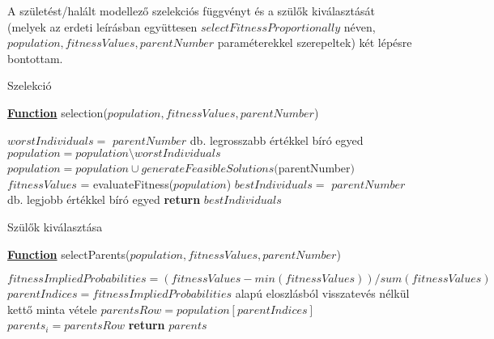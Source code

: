 
A születést/halált modellező szelekciós függvényt és a szülők kiválasztását (melyek az erdeti leírásban együttesen $selectFitnessProportionally$ néven, $population,fitnessValues,parentNumber$ paraméterekkel szerepeltek) két lépésre bontottam.


\begin{algorithm}[H]
\caption{Szelekció}
\label{alg:selection} 
\textbf{\underline{Function}} selection($population,fitnessValues,parentNumber$)
\begin{algorithmic}[1] %
\STATE $worstIndividuals =$ $parentNumber$ db. legrosszabb értékkel bíró egyed 
\STATE $population = population \setminus worstIndividuals$
\STATE $population = population \cup generateFeasibleSolutions($parentNumber$)$
\STATE $fitnessValues$ = evaluateFitness($population$)
\STATE $bestIndividuals =$ $parentNumber$ db. legjobb értékkel bíró egyed 
\STATE \textbf{return} $bestIndividuals$
\end{algorithmic}
\end{algorithm}

\begin{algorithm}[H]
\caption{Szülők kiválasztása}
\label{alg:selectParents} 
\textbf{\underline{Function}} selectParents($population,fitnessValues,parentNumber$)
\begin{algorithmic}[1]
\STATE $fitnessImpliedProbabilities = (fitnessValues - min(fitnessValues)) / sum(fitnessValues)$
	\STATE $parentIndices = fitnessImpliedProbabilities$ alapú eloszlásból visszatevés nélkül kettő minta vétele
	\STATE $parentsRow = population[parentIndices]$
	\STATE $parents_i = parentsRow$
\ENDFOR
\STATE \textbf{return} $parents$
\end{algorithmic}
\end{algorithm}

